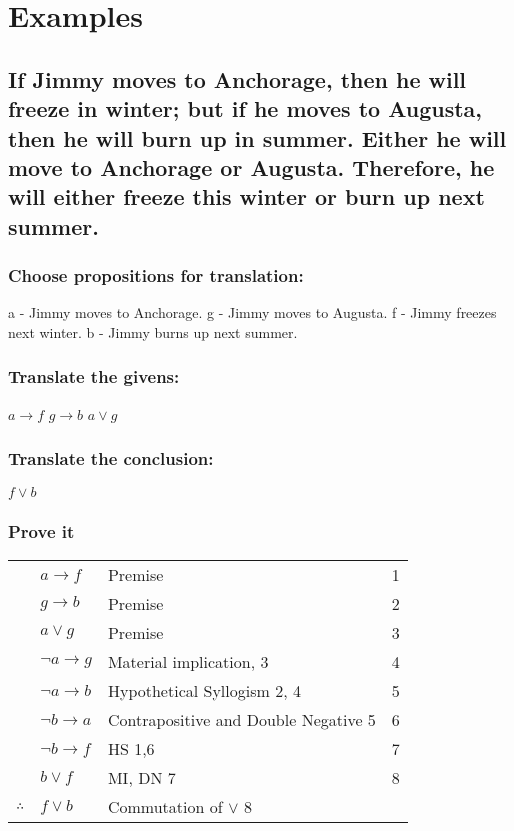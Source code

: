 \documentclass[11pt]{article}
\begin{document}
\section{Examples}
\label{sec:orgbdb0b19}
\subsection{If Jimmy moves to Anchorage, then he will freeze in winter; but if he moves to Augusta, then he will burn up in summer.  Either he will move to Anchorage or Augusta.  Therefore, he will either freeze this winter or burn up next summer.}
\label{sec:org93d2e19}
\subsubsection{Choose propositions for translation:}
\label{sec:org8475ba9}
a - Jimmy moves to Anchorage.
g - Jimmy moves to Augusta.
f - Jimmy freezes next winter.
b - Jimmy burns up next summer.
\subsubsection{Translate the givens:}
\label{sec:orgc69e3d6}
\(a \rightarrow f\)
\(g \rightarrow b\)
\(a \lor g\)
\subsubsection{Translate the conclusion:}
\label{sec:org7de33de}
\(f \lor b\)
\subsubsection{Prove it}
\label{sec:org5bad221}
\begin{center}
\begin{tabular}{lllr}
 & \(a \rightarrow f\) & Premise & 1\\
 & \(g \rightarrow b\) & Premise & 2\\
 & \(a \lor g\) & Premise & 3\\
 & \(\lnot a \rightarrow g\) & Material implication, 3 & 4\\
 & \(\lnot a \rightarrow b\) & Hypothetical Syllogism 2, 4 & 5\\
 & \(\lnot b \rightarrow a\) & Contrapositive and Double Negative 5 & 6\\
 & \(\lnot b \rightarrow f\) & HS 1,6 & 7\\
 & \(b \lor f\) & MI, DN 7 & 8\\
\(\therefore\) & \(f \lor b\) & Commutation of \(\lor\) 8 & \\
\end{tabular}
\end{center}
\end{document}
